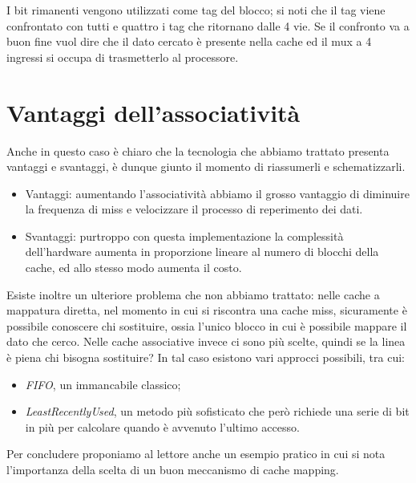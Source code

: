 \documentclass[class=book, crop=false, oneside]{standalone}
\begin{document}
I bit rimanenti vengono utilizzati come tag del blocco; si noti che il tag viene confrontato con tutti e quattro i tag che ritornano dalle 4 vie.
Se il confronto va a buon fine vuol dire che il dato cercato è presente nella cache ed il mux a 4 ingressi si occupa di trasmetterlo al processore.

\section{Vantaggi dell'associatività}
Anche in questo caso è chiaro che la tecnologia che abbiamo trattato presenta vantaggi e svantaggi, è dunque giunto il momento di riassumerli e schematizzarli.
\begin{itemize}
	\item Vantaggi: aumentando l’associatività abbiamo il grosso vantaggio di diminuire la frequenza di miss e velocizzare il processo di reperimento dei dati.
	\item Svantaggi: purtroppo con questa implementazione la complessità dell'hardware aumenta in proporzione lineare al numero di blocchi della cache, ed allo stesso modo aumenta il costo.
\end{itemize}
Esiste inoltre un ulteriore problema che non abbiamo trattato: nelle cache a mappatura diretta, nel momento in cui si riscontra una cache miss, sicuramente è possibile conoscere chi sostituire, ossia l’unico blocco in cui è possibile mappare il dato che cerco. Nelle cache associative invece ci sono più scelte, quindi se la linea è piena chi bisogna sostituire? In tal caso esistono vari approcci possibili, tra cui:
\begin{itemize}
	\item \emph{FIFO}, un immancabile classico;
	\item \emph{LeastRecentlyUsed}, un metodo più sofisticato che però richiede una serie di bit in più per calcolare quando è avvenuto l'ultimo accesso.
\end{itemize}
Per concludere proponiamo al lettore anche un esempio pratico in cui si nota l'importanza della scelta di un buon meccanismo di cache mapping.
\end{document}
